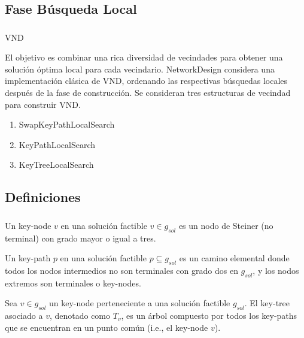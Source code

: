 \subsection{Fase Búsqueda Local}
\begin{frame}\frametitle{}
\begin{block}{VND}
\begin{small}
El objetivo es combinar una rica diversidad de vecindades para obtener una solución óptima local para cada vecindario. NetworkDesign considera una implementación clásica de VND, ordenando las respectivas búsquedas locales después de la fase de construcción. Se consideran tres estructuras de vecindad para construir VND.
\begin{enumerate}
 \item SwapKeyPathLocalSearch
 \item KeyPathLocalSearch
 \item KeyTreeLocalSearch
\end{enumerate} 
\end{small}
\end{block}
\end{frame}

\subsection{Definiciones}
\begin{frame}\frametitle{}
\begin{definition}
Un key-node $v$ en una solución factible $v \in g_{sol}$ es un nodo de Steiner (no terminal) con grado mayor o igual a tres.
\end{definition}
\begin{definition}
Un key-path $p$ en una solución factible $p \subseteq g_{sol}$ es un camino elemental 
donde todos los nodos intermedios no son terminales con grado dos en $g_{sol}$, 
y los nodos extremos son terminales o key-nodes.
\end{definition}
\begin{definition}
Sea $v \in g_{sol}$ un key-node perteneciente a una solución factible $g_{sol}$. 
El key-tree asociado a $v$, denotado como $T_v$, es un árbol compuesto por todos los 
key-paths que se encuentran en un punto común (i.e., el key-node $v$).
\end{definition}
\end{frame}

